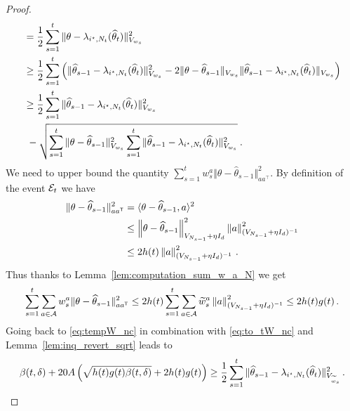 \begin{proof}
\begin{align}
&=   \frac{1}{2} \sum_{s=1}^t  \Vert \theta - \lambda_{i^\star,N_t}(\widehat{\theta}_t) \Vert_{V_{w_s}}^2
\nonumber\\
&\ge \frac{1}{2} \sum_{s=1}^t \left(\Vert \widehat{\theta}_{s-1} - \lambda_{i^\star,N_t}(\widehat{\theta}_t)\Vert_{V_{w_s}}^2 - 2\Vert \theta - \widehat{\theta}_{s-1} \Vert_{V_{w_s}} \Vert \widehat{\theta}_{s-1} - \lambda_{i^\star,N_t}(\widehat{\theta}_t) \Vert_{V_{w_s}}\right)
\nonumber\\
&\ge \frac{1}{2} \sum_{s=1}^t \Vert \widehat{\theta}_{s-1} - \lambda_{i^\star,N_t}(\widehat{\theta}_t) \Vert_{V_{w_s}}^2
\nonumber\\
&\ - \sqrt{\sum_{s=1}^t \Vert \theta - \widehat{\theta}_{s-1} \Vert_{V_{w_s}}^2 \sum_{s=1}^t\Vert \widehat{\theta}_{s-1} -\lambda_{i^\star,N_t}(\widehat{\theta}_t) \Vert_{V_{w_s}}^2}
\: .\label{eq:tempW_nc}
\end{align}
We need to upper bound the quantity $\sum_{s=1}^t  w_s^{a}\Vert \theta - \hat{\theta}_{s-1} \Vert_{a a^\top}^2$. By definition of the event $\mathcal{E}_t$ we have
\begin{align*}
  \Vert \theta - \widehat{\theta}_{s-1} \Vert_{a a^{\mathsf{\scriptscriptstyle T}}}^2 &=  \langle \theta - \widehat{\theta}_{s-1} ,a\rangle^2\\
  &\leq\left\lVert \theta - \widehat{\theta}_{s-1}\right\rVert_{V_{N_{s-1}}+\eta I_d}^2 \left\lVert a\right\rVert_{(V_{N_{s-1}}+\eta I_d)^{-1}}^2\\
  &\leq 2 h(t) \left\lVert a \right\rVert_{(V_{N_{s-1}}+\eta I_d)^{-1}}^2\,.
\end{align*}
Thus thanks to Lemma~\ref{lem:computation_sum_w_a_N} we get
\begin{align*}
  \sum_{s=1}^t \sum_{a\in\mathcal{A}} w_s^{a}\Vert \theta - \widehat{\theta}_{s-1} \Vert_{a a^{\mathsf{\scriptscriptstyle T}}}^2 \leq 2h(t)\sum_{s=1}^t \sum_{a\in\mathcal{A}} \widetilde{w}_s^{a} \left\lVert a \right\rVert_{(V_{N_{s-1}}+\eta I_d)^{-1}}^2 \leq 2h(t)g(t)\,.
\end{align*}
Going back to \eqref{eq:tempW_nc} in combination with \eqref{eq:to_tW_nc} and Lemma~\ref{lem:inq_revert_sqrt} leads to
\begin{align}
\label{eq:to_hteta_nc}
\beta(t,\delta) + 20 A\left(\sqrt{h(t)g(t) \beta(t,\delta)}+ 2h(t)g(t)\right)   \geq
\frac{1}{2}\sum_{s=1}^t \Vert \widehat{\theta}_{s-1} - \lambda_{i^\star,N_t}(\widehat{\theta}_t)\Vert_{V_{\widetilde{w}_s}}^2\,.
\end{align}
\end{proof}


